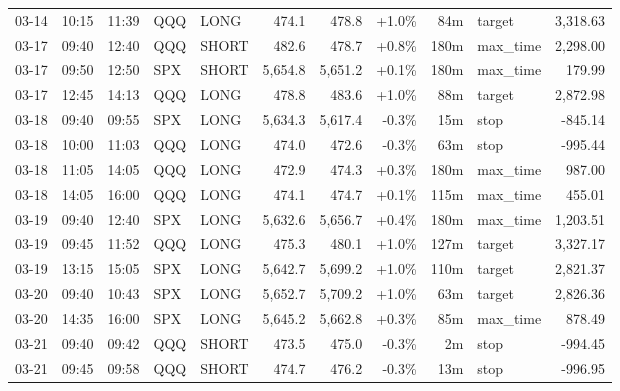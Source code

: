 \documentclass[11pt,a4paper,twoside]{article}
\begin{document}
\begin{center}
\begin{longtable}{>{\color{txtmain}}l l l l l r r r r >{\color{txtmain}}l r}
03-14 & 10:15 & 11:39 & QQQ & LONG & 474.1 & 478.8 & \textcolor{wingreen}{+1.0\%} & 84m & target & \textcolor{wingreen}{3,318.63} \\
03-17 & 09:40 & 12:40 & QQQ & SHORT & 482.6 & 478.7 & \textcolor{wingreen}{+0.8\%} & 180m & max\_time & \textcolor{wingreen}{2,298.00} \\
03-17 & 09:50 & 12:50 & SPX & SHORT & 5,654.8 & 5,651.2 & \textcolor{wingreen}{+0.1\%} & 180m & max\_time & \textcolor{wingreen}{179.99} \\
03-17 & 12:45 & 14:13 & QQQ & LONG & 478.8 & 483.6 & \textcolor{wingreen}{+1.0\%} & 88m & target & \textcolor{wingreen}{2,872.98} \\
03-18 & 09:40 & 09:55 & SPX & LONG & 5,634.3 & 5,617.4 & \textcolor{lossred}{-0.3\%} & 15m & stop & \textcolor{lossred}{-845.14} \\
03-18 & 10:00 & 11:03 & QQQ & LONG & 474.0 & 472.6 & \textcolor{lossred}{-0.3\%} & 63m & stop & \textcolor{lossred}{-995.44} \\
03-18 & 11:05 & 14:05 & QQQ & LONG & 472.9 & 474.3 & \textcolor{wingreen}{+0.3\%} & 180m & max\_time & \textcolor{wingreen}{987.00} \\
03-18 & 14:05 & 16:00 & QQQ & LONG & 474.1 & 474.7 & \textcolor{wingreen}{+0.1\%} & 115m & max\_time & \textcolor{wingreen}{455.01} \\
03-19 & 09:40 & 12:40 & SPX & LONG & 5,632.6 & 5,656.7 & \textcolor{wingreen}{+0.4\%} & 180m & max\_time & \textcolor{wingreen}{1,203.51} \\
03-19 & 09:45 & 11:52 & QQQ & LONG & 475.3 & 480.1 & \textcolor{wingreen}{+1.0\%} & 127m & target & \textcolor{wingreen}{3,327.17} \\
03-19 & 13:15 & 15:05 & SPX & LONG & 5,642.7 & 5,699.2 & \textcolor{wingreen}{+1.0\%} & 110m & target & \textcolor{wingreen}{2,821.37} \\
03-20 & 09:40 & 10:43 & SPX & LONG & 5,652.7 & 5,709.2 & \textcolor{wingreen}{+1.0\%} & 63m & target & \textcolor{wingreen}{2,826.36} \\
03-20 & 14:35 & 16:00 & SPX & LONG & 5,645.2 & 5,662.8 & \textcolor{wingreen}{+0.3\%} & 85m & max\_time & \textcolor{wingreen}{878.49} \\
03-21 & 09:40 & 09:42 & QQQ & SHORT & 473.5 & 475.0 & \textcolor{lossred}{-0.3\%} & 2m & stop & \textcolor{lossred}{-994.45} \\
03-21 & 09:45 & 09:58 & QQQ & SHORT & 474.7 & 476.2 & \textcolor{lossred}{-0.3\%} & 13m & stop & \textcolor{lossred}{-996.95} \\

\end{longtable}
\end{center}
\end{document}
